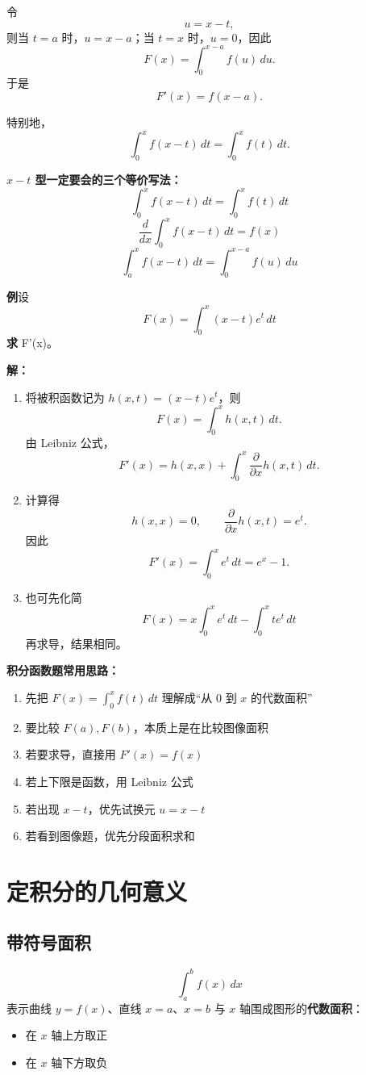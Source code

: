 \documentclass[12pt,a4paper]{ctexart}
\begin{document}
令
\[
u=x-t,
\]
则当 $t=a$ 时，$u=x-a$；当 $t=x$ 时，$u=0$，因此
\[
F(x)=\int_0^{x-a} f(u)\,du.
\]
于是
\[
F'(x)=f(x-a).
\]

特别地，
\[
\int_0^x f(x-t)\,dt=\int_0^x f(t)\,dt.
\]

\begin{keybox}
\textbf{$x-t$ 型一定要会的三个等价写法：}
\[
\int_0^x f(x-t)\,dt=\int_0^x f(t)\,dt
\]
\[
\frac{d}{dx}\int_0^x f(x-t)\,dt=f(x)
\]
\[
\int_a^x f(x-t)\,dt=\int_0^{x-a} f(u)\,du
\]
\end{keybox}

\begin{examplebox}
\textbf{例}\quad 设
\[
F(x)=\int_0^x (x-t)e^{t}\,dt
\]
\textbf{求 } F'(x)。
\par\textbf{解：}
\begin{enumerate}
  \item 将被积函数记为 $h(x,t)=(x-t)e^t$，则
  \[
  F(x)=\int_0^x h(x,t)\,dt.
  \]
  由 Leibniz 公式，
  \[
  F'(x)=h(x,x)+\int_0^x \frac{\partial}{\partial x}h(x,t)\,dt.
  \]
  \item 计算得
  \[
  h(x,x)=0,\qquad \frac{\partial}{\partial x}h(x,t)=e^t.
  \]
  因此
  \[
  F'(x)=\int_0^x e^t\,dt=e^x-1.
  \]
  \item 也可先化简
  \[
  F(x)=x\int_0^x e^t\,dt-\int_0^x te^t\,dt
  \]
  再求导，结果相同。
\end{enumerate}
\end{examplebox}

\begin{methodbox}
\textbf{积分函数题常用思路：}
\begin{enumerate}
  \item 先把 $F(x)=\int_0^x f(t)\,dt$ 理解成“从 $0$ 到 $x$ 的代数面积”
  \item 要比较 $F(a),F(b)$，本质上是在比较图像面积
  \item 若要求导，直接用 $F'(x)=f(x)$
  \item 若上下限是函数，用 Leibniz 公式
  \item 若出现 $x-t$，优先试换元 $u=x-t$
  \item 若看到图像题，优先分段面积求和
\end{enumerate}
\end{methodbox}

\section{定积分的几何意义}

\subsection{带符号面积}
\[
\int_a^b f(x)\,dx
\]
表示曲线 $y=f(x)$、直线 $x=a$、$x=b$ 与 $x$ 轴围成图形的\textbf{代数面积}：
\begin{itemize}
  \item 在 $x$ 轴上方取正
  \item 在 $x$ 轴下方取负
\end{itemize}
\end{document}
